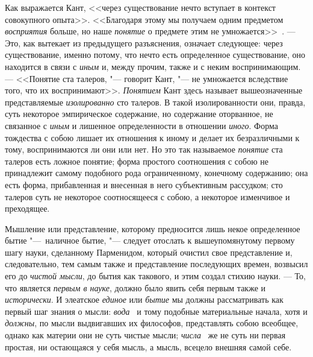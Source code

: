 Как выражается Кант, <<через существование нечто вступает в контекст
совокупного опыта>>. <<Благодаря этому мы получаем одним предметом
{\em восприятия} больше, но наше
{\em понятие} о предмете этим не
умножается>>~. --- Это, как вытекает из предыдущего
разъяснения, означает следующее: через существование, именно потому, что
нечто есть определенное существование, оно находится в связи с
{\em иным} и, между прочим, также и с неким
воспринимающим. --- <<Понятие ста талеров, "--- говорит Кант, "--- не умножается
вследствие того, что их воспринимают>>. {\em Понятием}
Кант здесь называет вышеозначенные представляемые
{\em изолированно} сто талеров. В такой изолированности
они, правда, суть некоторое эмпирическое содержание, но содержание
оторванное, не связанное с {\em иным} и лишенное
определенности в отношении {\em иного}. Форма
тождества с собою лишает их отношения к иному и делает их безразличными к
тому, воспринимаются ли они или нет. Но это так называемое
{\em понятие} ста талеров есть ложное понятие; форма
простого соотношения с собою не принадлежит самому подобного рода
ограниченному, конечному содержанию; она есть форма, прибавленная и
внесенная в него субъективным рассудком; сто талеров суть не некоторое
соотносящееся с собою, а некоторое изменчивое и преходящее.

Мышление или представление, которому предносится лишь некое определенное
бытие "---~наличное бытие, "--- следует отослать к вышеупомянутому первому шагу
науки, сделанному Парменидом, который очистил свое представление и,
следовательно, тем самым также и представление последующих времен, возвысил
его до {\em чистой мысли}, до бытия как такового, и
этим создал стихию науки. --- То, что является
{\em первым в науке}, должно было явить себя первым
также и {\em исторически}. И элеатское
{\em единое} или {\em бытие} мы
должны рассматривать как первый шаг знания о мысли:
{\em вода}~ и тому
подобные материальные начала, хотя и {\em должны}, по
мысли выдвигавших их философов, представлять собою всеобщее, однако как
материи они не суть чистые мысли;
{\em числа}~ же не суть ни первая
простая, ни остающаяся у себя мысль, а мысль, всецело внешняя самой себе.

